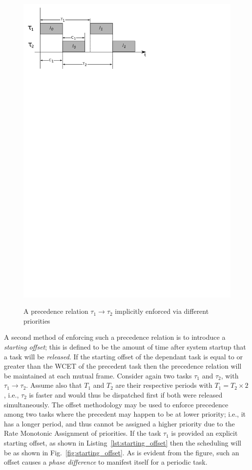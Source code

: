 \begin{figure}
\centering
\includegraphics[scale=0.75]{figs/precedence_priority}
\label{fig:precendence_priority}
\caption{A precedence relation $\tau_1 \to \tau_2$ implicitly enforced
  via different priorities}
\end{figure}

A second method of enforcing such a precedence relation is to
introduce a \emph{starting offset}; this is defined to be the amount
of time after system startup that a task will be \emph{released}. If
the starting offset of the dependant task is equal to or greater than
the WCET of the precedent task then the precedence relation will be
maintained at each mutual frame. Consider again two tasks $\tau_1$ and
$\tau_2$, with $\tau_1 \to \tau_2$. Assume also that $T_1$ and $T_2$
are their respective periods with $T_1 = T_2 \times 2$, i.e., $\tau_2$
is faster and would thus be dispatched first if both were released
simultaneously. The offset methodology may be used to enforce
precedence among two tasks where the precedent may happen to be at
lower priority; i.e., it has a longer period, and thus cannot be
assigned a higher priority due to the Rate Monotonic Assignment of
priorities. If the task $\tau_1$ is provided an explicit starting
offset, as shown in Listing~\ref{lst:starting_offset} then the
scheduling will be as shown in Fig.~\ref{fig:starting_offset}. As is
evident from the figure, such an offset causes a \emph{phase
  difference} to manifest itself for a periodic task.


